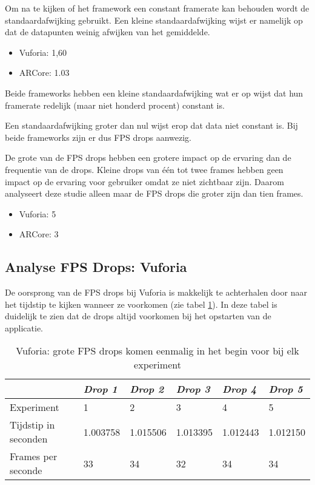 Om na te kijken of het framework een constant framerate kan behouden wordt de standaardafwijking gebruikt. Een kleine standaardafwijking wijst er namelijk op dat de datapunten weinig afwijken van het gemiddelde.

\begin{itemize}
    \item Vuforia: 1,60
    \item ARCore: 1.03
\end{itemize}

Beide frameworks hebben een kleine standaardafwijking wat er op wijst dat hun framerate redelijk (maar niet honderd procent) constant is. 

Een standaardafwijking groter dan nul wijst erop dat data niet constant is. Bij beide frameworks zijn er dus FPS drops aanwezig.

De grote van de FPS drops hebben een grotere impact op de ervaring dan de frequentie van de drops. Kleine drops van één tot twee frames hebben geen impact op de ervaring voor gebruiker omdat ze niet zichtbaar zijn. Daarom analyseert deze studie alleen maar de FPS drops die groter zijn dan tien frames.

\begin{itemize}
    \item Vuforia: 5
    \item ARCore: 3
\end{itemize}

\subsection{Analyse FPS Drops: Vuforia}

De oorsprong van de FPS drops bij Vuforia is makkelijk te achterhalen door naar het tijdstip te kijken wanneer ze voorkomen (zie tabel \ref{tbl:vuforiadrop}). In deze tabel is duidelijk te zien dat de drops altijd voorkomen bij het opstarten van de applicatie.

\begin{table}
    \centering
    \begin{tabular}{llllll}\toprule
        & \textit{Drop 1}   & \textit{Drop 2}   & \textit{Drop 3}   & \textit{Drop 4}   & \textit{Drop 5}   \\ \midrule
        Experiment         & 1        & 2        & 3        & 4        & 5        \\
        Tijdstip in seconden          & 1.003758 & 1.015506 & 1.013395 & 1.012443 & 1.012150 \\
        Frames per seconde & 33       & 34       & 32       & 34       & 34      \\ \bottomrule
    \end{tabular}
    \caption{Vuforia: grote FPS drops komen eenmalig in het begin voor bij elk experiment}\label{tbl:vuforiadrop}
\end{table}

